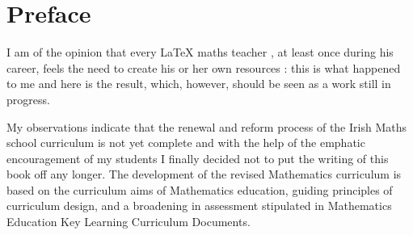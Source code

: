\chapter*{Preface}

 
 
I am of the opinion that every \LaTeX\xspace maths teacher , at least once during 
his career, feels the need to create his or her own resources : this is what 
happened to me and here is the result, which, however, should be seen as 
a work still in progress. 






 
 
 
My observations indicate that  the  renewal  and reform process  of the Irish Maths school curriculum is not yet complete 
and with the help of the emphatic encouragement  of my students    I finally decided not to put the writing of this book off any longer.  The
development of the revised Mathematics curriculum is based on the curriculum aims of
Mathematics education, guiding principles of curriculum design, and  a broadening in assessment
stipulated in Mathematics Education Key Learning  Curriculum Documents. 



